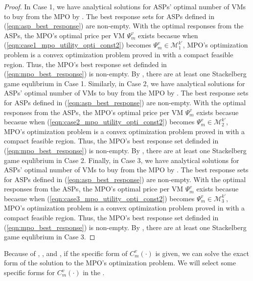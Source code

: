 \documentclass[conference]{IEEEtran}
\begin{document}
\begin{proof}
In Case 1, we have analytical solutions for ASPs' optimal number of VMs to buy from the MPO by . The best response sets for ASPs defined in (\ref{eqn:asp_best_response}) are non-empty. With the optimal responses from the ASPs, the MPO's optimal price per VM $\Psi_m^v$ exists becasue when (\ref{eqn:case1_mpo_utility_opti_const2}) becomes $\Psi_m^v \in \mathcal{M}_1^{k'}$, MPO's optimization problem is a convex optimization problem proved in  with a compact feasible region. Thus, the MPO's best response set definded in (\ref{eqn:mpo_best_response}) is non-empty. By , there are at least one Stackelberg game equlibrium in Case 1. Similarly, in Case 2, we have analytical solutions for ASPs' optimal number of VMs to buy from the MPO by . The best response sets for ASPs defined in (\ref{eqn:asp_best_response}) are non-empty. With the optimal responses from the ASPs, the MPO's optimal price per VM $\Psi_m^v$ exists becasue becasue when (\ref{eqn:case2_mpo_utility_opti_const2}) becomes $\Psi_m^v \in \mathcal{M}_2^{k'}$, MPO's optimization problem is a convex optimization problem proved in  with a compact feasible region. Thus, the MPO's best response set definded in (\ref{eqn:mpo_best_response}) is non-empty. By , there are at least one Stackelberg game equlibrium in Case 2. Finally, in Case 3, we have analytical solutions for ASPs' optimal number of VMs to buy from the MPO by . The best response sets for ASPs defined in (\ref{eqn:asp_best_response}) are non-empty. With the optimal responses from the ASPs, the MPO's optimal price per VM $\Psi_m^v$ exists becasue becasue when (\ref{eqn:case3_mpo_utility_opti_const2}) becomes $\Psi_m^v \in \mathcal{M}_3^{k'}$, MPO's optimization problem is a convex optimization problem proved in  with a compact feasible region. Thus, the MPO's best response set definded in (\ref{eqn:mpo_best_response}) is non-empty. By , there are at least one Stackelberg game equlibrium in Case 3.
\end{proof}
Because of , , and , if the specific form of $C_m^v(\cdot)$ is given, we can solve the exact form of the solution to the MPO's optimization problem. We will select some specific forms for $C_m^v(\cdot)$ in the .
\end{document}
